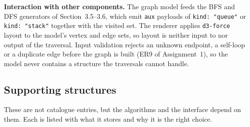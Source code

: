 \documentclass[11pt,a4paper]{article}
\newcommand{\ct}[1]{\texttt{#1}}
\begin{document}
\smallskip
\noindent\textbf{Interaction with other components.} The graph model feeds the BFS and DFS
generators of Section~3.5--3.6, which emit \ct{aux} payloads of \ct{kind: "queue"} or
\ct{kind: "stack"} together with the visited set. The renderer applies \ct{d3-force} layout to the
model's vertex and edge sets, so layout is neither input to nor output of the traversal. Input
validation rejects an unknown endpoint, a self-loop or a duplicate edge before the graph is built
(ER9 of Assignment~1), so the model never contains a structure the traversals cannot handle.

\subsection{Supporting structures}

These are not catalogue entries, but the algorithms and the interface depend on them. Each is
listed with what it stores and why it is the right choice.
\end{document}
